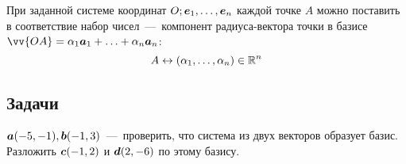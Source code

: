 \documentclass[a4paper,12pt]{article}
\begin{document}
  \begin{remark}
    При заданной системе координат $O; \boldsymbol e_1, \ldots, \boldsymbol e_n$ каждой точке $A$ можно поставить в соответствие набор чисел~---~компонент радиуса-вектора точки в базисе $\vv{OA} \hm= \alpha_1 \bds a_1 \hm+ \ldots \hm+ \alpha_n \bds a_n$:
    \[
      A \leftrightarrow (\alpha_1, \ldots, \alpha_n) \in \operatorname{\mathbb R}^n
    \]
  \end{remark}
  
  
  \subsection{Задачи}
  
  \begin{problem}[1.6]
    $\boldsymbol a(-5, -1), \boldsymbol b(-1, 3)$~---~проверить, что система из двух векторов образует базис.
    Разложить $\boldsymbol c(-1, 2)$ и $\boldsymbol d(2, -6)$ по этому базису.
  \end{problem}
  
\end{document}
